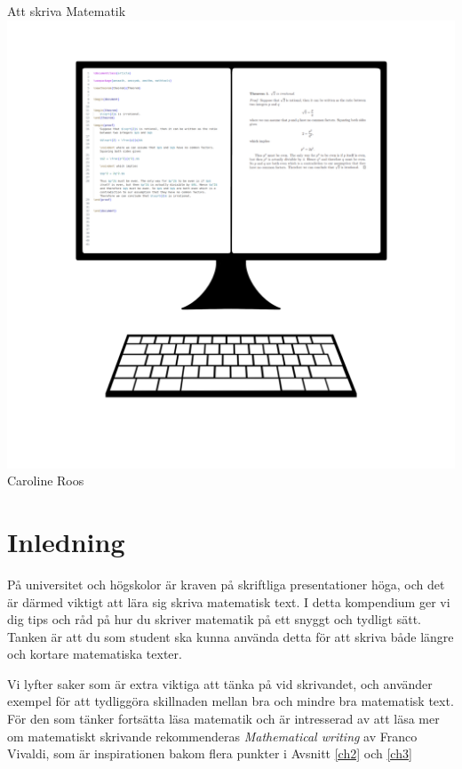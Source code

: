 \documentclass[titlepage]{article}
\begin{document}
\begin{titlepage}
\begin{center}
    \Huge Att skriva Matematik
    \vfill
    \includegraphics[width = \linewidth]{frontv2.png}
    \vfill
    \Large
    Caroline Roos
\end{center}    
\end{titlepage}


\tableofcontents
\thispagestyle{empty}

\newpage
\setcounter{page}{1}




\section{Inledning}

På universitet och högskolor är kraven på skriftliga presentationer höga, och det är därmed viktigt att lära sig skriva matematisk text. I detta kompendium ger vi dig tips och råd på hur du skriver matematik på ett snyggt och tydligt sätt. Tanken är att du som student ska kunna använda detta för att skriva både längre och kortare matematiska texter.

Vi lyfter saker som är extra viktiga att tänka på vid skrivandet, och använder exempel för att tydliggöra skillnaden mellan bra och mindre bra matematisk text. För den som tänker fortsätta läsa matematik och är intresserad av att läsa mer om matematiskt skrivande rekommenderas \textit{Mathematical writing} av Franco Vivaldi\cite{vivaldi}, som är inspirationen bakom flera punkter i Avsnitt \ref{ch2} och \ref{ch3}
\end{document}
